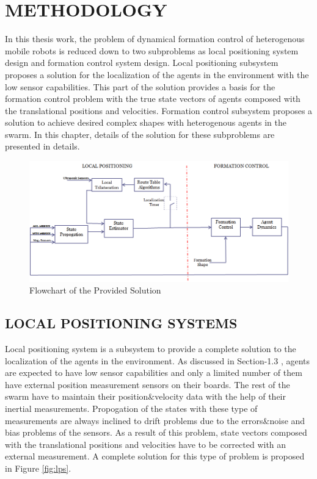 

\chapter{METHODOLOGY}
\label{chp:Methodology}






In this thesis work, the problem of dynamical formation control of heterogenous mobile robots is reduced down to two subproblems as local positioning system design and formation control system design. Local positioning subsystem proposes  a  solution for the localization of the agents in the environment with the low sensor capabilities. This part of the solution provides a basis for the formation control problem with the true state vectors of agents composed with the translational positions and velocities. Formation control subsystem proposes a solution to achieve desired complex shapes with heterogenous agents in the swarm.  In this chapter, details of the solution for these subproblems are presented in details. 

\begin{figure}[H]
\caption{Flowchart of the Provided Solution}
\centering
\includegraphics[scale = 0.65]{general_scheme}
\end{figure}

\section{LOCAL POSITIONING SYSTEMS} \label{LOCAL POSITIONING SYSTEMS_ref}
Local positioning system is a subsystem to provide a complete solution to the localization of the agents in the environment. As discussed in Section-1.3 , agents are expected to have low sensor capabilities and only a limited number of them have external position measurement sensors on their boards. The rest of the swarm have to maintain their position$\&$velocity data with the help of their inertial measurements. Propogation of the states with these type of measurements are always inclined to drift problems due to the errors$\&$noise and bias problems of the sensors. As a result of this problem, state vectors composed with the translational positions and velocities have to be corrected with an external measurement. A complete solution for this type of problem is proposed in Figure \ref{fig:lps}.


